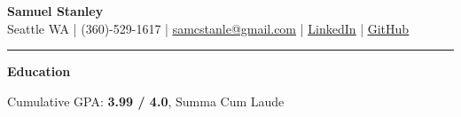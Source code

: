\documentclass[10pt]{article}
\begin{document}
  \begin{center}
    {\fontsize{20}{20}\selectfont \textbf{Samuel Stanley}}\\[5pt]
    Seattle WA | (360)-529-1617 |
    \href{mailto:samcstanle@gmail.com}{\uline{samcstanle@gmail.com}} |
    \href{https://www.linkedin.com/in/samuel-stanley-1ba48b24a/}{\uline{LinkedIn}} |
    \href{https://github.com/SamStan4}{\uline{GitHub}}
    \rule{\linewidth}{0.4pt}
  \end{center}
  \vspace{-15pt}
  \begin{center}
    {\fontsize{15}{20}\selectfont \textbf{Education}}
  \end{center}
  \vspace{-15pt}
  \noindent
  \noindent
  \vspace{5pt}
  Cumulative GPA: \textbf{3.99 / 4.0}, Summa Cum Laude
\end{document}
